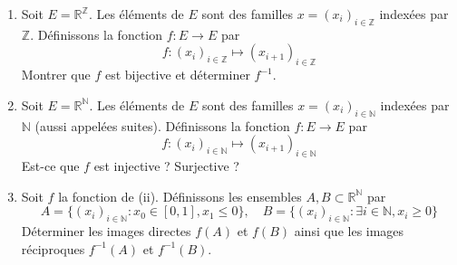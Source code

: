 \documentclass[a4paper, 10pt]{report}
\begin{document}
	\begin{enumerate}[label=(\roman*)]
		\item Soit $E = \mathbb{R}^{\mathbb{Z}}$. Les éléments de $E$
		sont des familles $x = (x_i)_{i \in \mathbb{Z}}$ indexées par
		$\mathbb{Z}$. Définissons la fonction $f : E \to E$ par
		\[
		f : (x_i)_{i \in \mathbb{Z}} \mapsto (x_{i+1})_{i \in \mathbb{Z}}
		\]
		Montrer que $f$ est bijective et déterminer $f^{-1}$.
		\item Soit $E = \mathbb{R}^{\mathbb{N}}$. Les éléments de $E$
		sont des familles $x = (x_i)_{i \in \mathbb{N}}$ indexées par
		$\mathbb{N}$ (aussi appelées suites).
		Définissons la fonction $f : E \to E$ par
		\[
		f : (x_i)_{i \in \mathbb{N}} \mapsto (x_{i+1})_{i \in \mathbb{N}}
		\]
		Est-ce que $f$ est injective ? Surjective ?
		\item Soit $f$ la fonction de (ii). Définissons les ensembles
		$A, B \subset \mathbb{R}^{\mathbb{N}}$ par
		\[
		A = \{(x_i)_{i \in \mathbb{N}} : x_0 \in [0,1], x_1 \leq 0\},
		\quad
		B = \{(x_i)_{i \in \mathbb{N}} : \exists i \in \mathbb{N}, x_i \geq 0\}
		\]
		Déterminer les images directes $f(A)$ et $f(B)$ ainsi que les
		images réciproques $f^{-1}(A)$ et $f^{-1}(B)$.
	\end{enumerate}
	
	\newpage
	
	\fancyhf{}
	\renewcommand{\headrule}
	{\rule{\textwidth}{0pt}}
	
\end{document}
